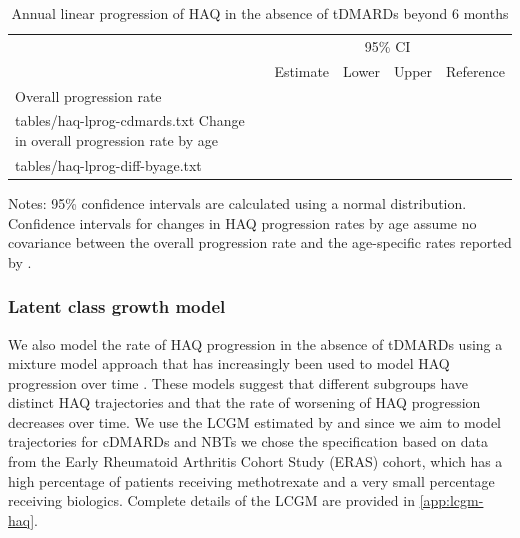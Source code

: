 \documentclass[11pt,final,fleqn]{article}\usepackage[]{graphicx}\usepackage[]{color}
\makeatletter
\theoremstyle{plain}
\newcommand*\ExpandableInput[1]{\@@input#1 }
\makeatother
\begin{document}
\begin{table}[!ht]
\begin{center}
\begin{threeparttable}
\caption{Annual linear progression of HAQ in the absence of tDMARDs beyond 6 months} \label{tbl:haq-lprog}
\footnotesize
\begin{tabularx}{\textwidth}{@{\extracolsep{\fill}}lrrrl}
\hline
\multicolumn{2}{l}{} & \multicolumn{2}{c}{95\% CI} & \multicolumn{1}{l}{} \\
\cmidrule{3-4} 
\multicolumn{1}{l}{} & \multicolumn{1}{r}{Estimate} & \multicolumn{1}{r}{Lower} & \multicolumn{1}{r}{Upper} & \multicolumn{1}{l}{Reference} \\
\hline
Overall progression rate \\
\ExpandableInput{tables/haq-lprog-cdmards.txt}
Change in overall progression rate by age \\
\ExpandableInput{tables/haq-lprog-diff-byage.txt}
\hline
\end{tabularx}
\scriptsize
Notes: 95\% confidence intervals are calculated using a normal distribution. Confidence intervals for changes in HAQ progression rates by age assume no covariance between the overall progression rate and the age-specific rates reported by \citet{michaud2011treatment}.
\end{threeparttable}
\end{center}
\end{table}

\subsubsection{Latent class growth model} \label{sec:haq-lcgm}
We also model the rate of HAQ progression in the absence of tDMARDs using a mixture model approach that has increasingly been used to model HAQ progression over time \citep{stevenson2016adalimumab, norton2013trajectories, norton2014health}. These models suggest that different subgroups have distinct HAQ trajectories and that the rate of worsening of HAQ progression decreases over time. We use the LCGM estimated by \citet{norton2014health} and since we aim to model trajectories for cDMARDs and NBTs we chose the specification based on data from the Early Rheumatoid Arthritis Cohort Study (ERAS) cohort, which has a high percentage of patients receiving methotrexate and a very small percentage receiving biologics. Complete details of the LCGM are provided in \autoref{app:lcgm-haq}. 
\end{document}
